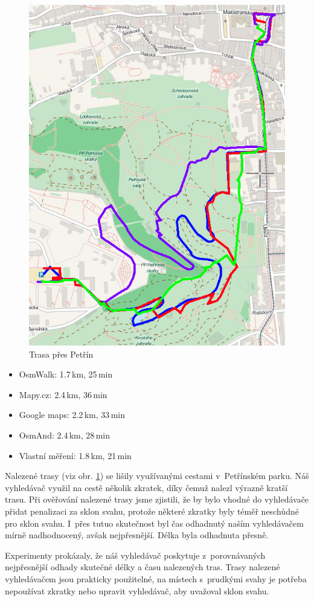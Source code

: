 \begin{figure}[h]
	\centering
	\includegraphics[width=13cm]{../img/ms-sh.png}
	\caption{Trasa přes Petřín}
	\label{fig:ms-sh}
\end{figure}
\begin{itemize}
	\item OsmWalk: 1.7\,km, 25\,min
	\item Mapy.cz: 2.4\,km, 36\,min
	\item Google maps: 2.2\,km, 33\,min
	\item OsmAnd: 2.4\,km, 28\,min
	\item Vlastní měření: 1.8\,km, 21\,min
\end{itemize}

Nalezené trasy (viz obr. \ref{fig:ms-sh}) se lišily využívanými cestami v~Petřínském parku. Náš vyhledávač
využil na cestě několik zkratek, díky čemuž nalezl výrazně kratší trasu. Při
ověřování nalezené trasy jsme zjistili, že by bylo vhodné do vyhledávače přidat
penalizaci za sklon svahu, protože některé zkratky byly téměř neschůdné
pro sklon svahu. I~přes tutuo skutečnost byl čas odhadnutý naším vyhledávačem
mírně nadhodnocený, avšak nejpřesnější. Délka byla odhadnuta přesně.

Experimenty prokázaly, že náš vyhledávač poskytuje z~porovnávaných nejpřesnější
odhady skutečné délky a času nalezených tras. Trasy nalezené vyhledávačem jsou
prakticky použitelné, na místech s~prudkými svahy je potřeba nepoužívat zkratky
nebo upravit vyhledávač, aby uvažoval sklon svahu. 
